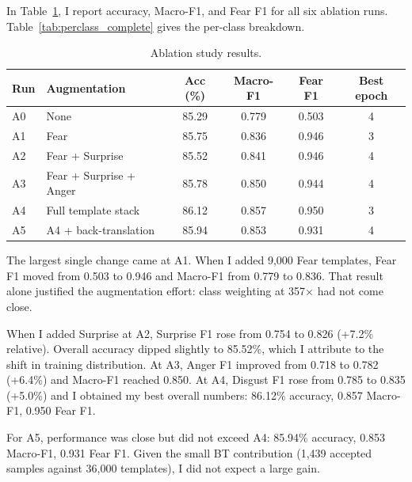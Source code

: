 \documentclass[11pt,a4paper]{article}
\begin{document}
In Table~\ref{tab:complete_results}, I report accuracy, Macro-F1, and Fear F1 for all six ablation runs. Table~\ref{tab:perclass_complete} gives the per-class breakdown.

\begin{table}[H]
\centering
\caption{Ablation study results.}
\label{tab:complete_results}
\begin{tabular}{@{}llcccc@{}}
\toprule
Run & Augmentation & Acc (\%) & Macro-F1 & Fear F1 & Best epoch \\
\midrule
A0 & None & 85.29 & 0.779 & 0.503 & 4 \\
A1 & Fear & 85.75 & 0.836 & 0.946 & 3 \\
A2 & Fear + Surprise & 85.52 & 0.841 & 0.946 & 4 \\
A3 & Fear + Surprise + Anger & 85.78 & 0.850 & 0.944 & 4 \\
\rowcolor{green!20}
A4 & Full template stack & 86.12 & 0.857 & 0.950 & 3 \\
\rowcolor{blue!10}
A5 & A4 + back-translation & 85.94 & 0.853 & 0.931 & 4 \\
\bottomrule
\end{tabular}
\end{table}

The largest single change came at A1. When I added 9,000 Fear templates, Fear F1 moved from 0.503 to 0.946 and Macro-F1 from 0.779 to 0.836. That result alone justified the augmentation effort: class weighting at 357$\times$ had not come close.

When I added Surprise at A2, Surprise F1 rose from 0.754 to 0.826 (+7.2\% relative). Overall accuracy dipped slightly to 85.52\%, which I attribute to the shift in training distribution. At A3, Anger F1 improved from 0.718 to 0.782 (+6.4\%) and Macro-F1 reached 0.850. At A4, Disgust F1 rose from 0.785 to 0.835 (+5.0\%) and I obtained my best overall numbers: 86.12\% accuracy, 0.857 Macro-F1, 0.950 Fear F1.

For A5, performance was close but did not exceed A4: 85.94\% accuracy, 0.853 Macro-F1, 0.931 Fear F1. Given the small BT contribution (1,439 accepted samples against 36,000 templates), I did not expect a large gain.
\end{document}
